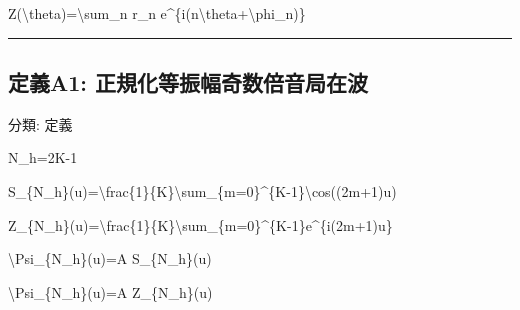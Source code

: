\documentclass[
  a4paper,
]{ltjsarticle}
\newenvironment{Shaded}{}{}
\newcommand{\NormalTok}[1]{#1}
\begin{document}
\begin{Shaded}
\begin{Highlighting}[]
\NormalTok{Z(\textbackslash{}theta)=\textbackslash{}sum\_n r\_n e\^{}\{i(n\textbackslash{}theta+\textbackslash{}phi\_n)\}}
\end{Highlighting}
\end{Shaded}

\begin{center}\rule{0.5\linewidth}{0.5pt}\end{center}

\subsection{定義A1:
正規化等振幅奇数倍音局在波}\label{ux5b9aux7fa9a1-ux6b63ux898fux5316ux7b49ux632fux5e45ux5947ux6570ux500dux97f3ux5c40ux5728ux6ce2}

分類: 定義

\begin{Shaded}
\begin{Highlighting}[]
\NormalTok{N\_h=2K{-}1}
\end{Highlighting}
\end{Shaded}

\begin{Shaded}
\begin{Highlighting}[]
\NormalTok{S\_\{N\_h\}(u)=\textbackslash{}frac\{1\}\{K\}\textbackslash{}sum\_\{m=0\}\^{}\{K{-}1\}\textbackslash{}cos((2m+1)u)}
\end{Highlighting}
\end{Shaded}

\begin{Shaded}
\begin{Highlighting}[]
\NormalTok{Z\_\{N\_h\}(u)=\textbackslash{}frac\{1\}\{K\}\textbackslash{}sum\_\{m=0\}\^{}\{K{-}1\}e\^{}\{i(2m+1)u\}}
\end{Highlighting}
\end{Shaded}

\begin{Shaded}
\begin{Highlighting}[]
\NormalTok{\textbackslash{}Psi\_\{N\_h\}(u)=A S\_\{N\_h\}(u)}
\end{Highlighting}
\end{Shaded}

\begin{Shaded}
\begin{Highlighting}[]
\NormalTok{\textbackslash{}Psi\_\{N\_h\}(u)=A Z\_\{N\_h\}(u)}
\end{Highlighting}
\end{Shaded}
\end{document}
